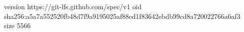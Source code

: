 version https://git-lfs.github.com/spec/v1
oid sha256:a5a7a552520fb48d7f9a9195025af88ed1f83642ebdb99cd8a720022766a6af3
size 5566
